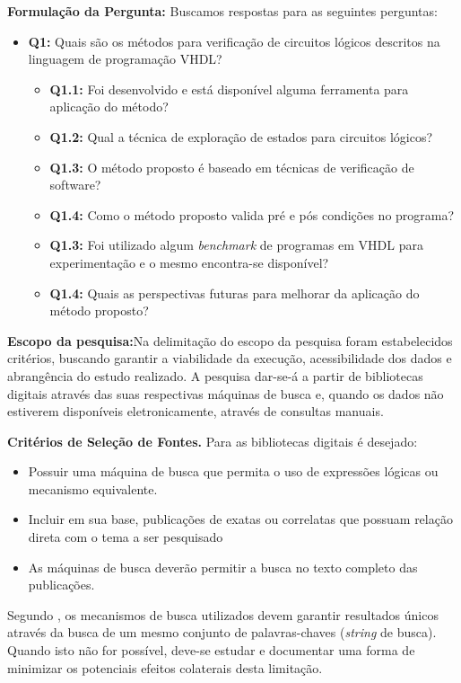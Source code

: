 \textbf{Formulação da Pergunta:} Buscamos respostas para as seguintes perguntas:
\begin{itemize}
\item \textbf{Q1:} Quais são os métodos para verificação de circuitos lógicos descritos na linguagem de programação VHDL?
	\begin{itemize}
	\item \textbf{Q1.1:} Foi desenvolvido e está disponível alguma ferramenta para aplicação do método?
	\item \textbf{Q1.2:} Qual a técnica de exploração de estados para circuitos lógicos?
	\item \textbf{Q1.3:} O método proposto é baseado em técnicas de verificação de software?
	\item \textbf{Q1.4:} Como o método proposto valida pré e pós condições no programa?
	\item \textbf{Q1.3:} Foi utilizado algum \textit{benchmark} de programas em VHDL para experimentação e o mesmo encontra-se disponível?
	\item \textbf{Q1.4:} Quais as perspectivas futuras para melhorar da aplicação do método proposto?
	\end{itemize}
\end{itemize}

\textbf{Escopo da pesquisa:}Na delimitação do escopo da pesquisa foram estabelecidos critérios, buscando garantir a viabilidade da execução, acessibilidade dos dados e abrangência do estudo realizado. A pesquisa dar-se-á a partir de bibliotecas digitais através das suas respectivas máquinas de busca e, quando os dados não estiverem disponíveis eletronicamente, através de consultas manuais.

\textbf{Critérios de Seleção de Fontes.} Para as bibliotecas digitais é desejado:
\begin{itemize}
  \item Possuir uma máquina de busca que permita o uso de expressões lógicas ou mecanismo equivalente.
  \item Incluir em sua base, publicações de exatas ou correlatas que possuam relação direta com o tema a ser pesquisado
  \item As máquinas de busca deverão permitir a busca no texto completo das publicações.
\end{itemize}

Segundo \citeauthor{rocha2015verificaccao}, os mecanismos de busca utilizados devem garantir resultados únicos através da busca de um mesmo conjunto de palavras-chaves (\textit{string} de busca). Quando isto não for possível, deve-se estudar e documentar uma forma de minimizar os potenciais efeitos colaterais desta limitação.

